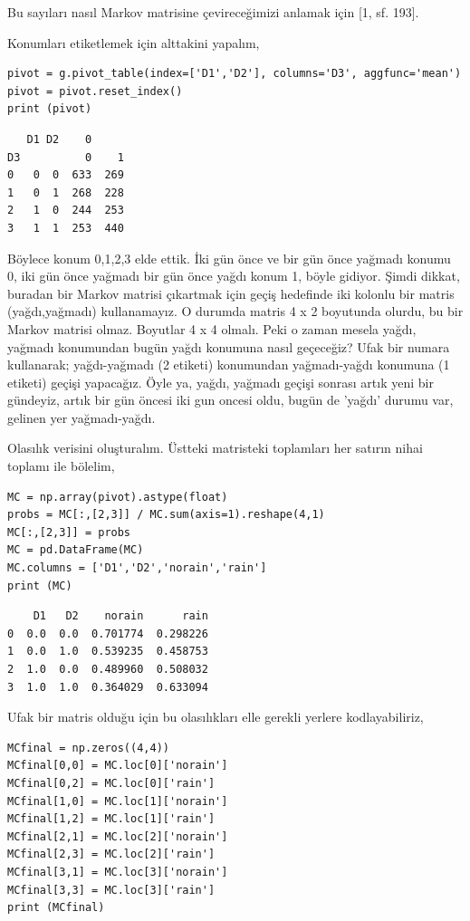 \documentclass[12pt,fleqn]{article}\usepackage{../../common}
\begin{document}
Bu sayıları nasıl Markov matrisine çevireceğimizi anlamak için [1, sf. 193].

Konumları etiketlemek için alttakini yapalım,

\begin{verbatim}
pivot = g.pivot_table(index=['D1','D2'], columns='D3', aggfunc='mean')
pivot = pivot.reset_index()
print (pivot)
\end{verbatim}

\begin{verbatim}
   D1 D2    0     
D3          0    1
0   0  0  633  269
1   0  1  268  228
2   1  0  244  253
3   1  1  253  440
\end{verbatim}

Böylece konum 0,1,2,3 elde ettik. İki gün önce ve bir gün önce yağmadı konumu 0,
iki gün önce yağmadı bir gün önce yağdı konum 1, böyle gidiyor. Şimdi dikkat,
buradan bir Markov matrisi çıkartmak için geçiş hedefinde iki kolonlu bir matris
(yağdı,yağmadı) kullanamayız. O durumda matris 4 x 2 boyutunda olurdu, bu bir
Markov matrisi olmaz. Boyutlar 4 x 4 olmalı. Peki o zaman mesela yağdı, yağmadı
konumundan bugün yağdı konumuna nasıl geçeceğiz? Ufak bir numara kullanarak;
yağdı-yağmadı (2 etiketi) konumundan yağmadı-yağdı konumuna (1 etiketi) geçişi
yapacağız. Öyle ya, yağdı, yağmadı geçişi sonrası artık yeni bir gündeyiz, artık
bir gün öncesi iki gun oncesi oldu, bugün de 'yağdı' durumu var, gelinen yer
yağmadı-yağdı.

Olasılık verisini oluşturalım. Üstteki matristeki toplamları her satırın nihai
toplamı ile bölelim,

\begin{verbatim}
MC = np.array(pivot).astype(float)
probs = MC[:,[2,3]] / MC.sum(axis=1).reshape(4,1)
MC[:,[2,3]] = probs
MC = pd.DataFrame(MC)
MC.columns = ['D1','D2','norain','rain']
print (MC)
\end{verbatim}

\begin{verbatim}
    D1   D2    norain      rain
0  0.0  0.0  0.701774  0.298226
1  0.0  1.0  0.539235  0.458753
2  1.0  0.0  0.489960  0.508032
3  1.0  1.0  0.364029  0.633094
\end{verbatim}

Ufak bir matris olduğu için bu olasılıkları elle gerekli yerlere kodlayabiliriz,

\begin{verbatim}
MCfinal = np.zeros((4,4))
MCfinal[0,0] = MC.loc[0]['norain']
MCfinal[0,2] = MC.loc[0]['rain']
MCfinal[1,0] = MC.loc[1]['norain']
MCfinal[1,2] = MC.loc[1]['rain']
MCfinal[2,1] = MC.loc[2]['norain']
MCfinal[2,3] = MC.loc[2]['rain']
MCfinal[3,1] = MC.loc[3]['norain']
MCfinal[3,3] = MC.loc[3]['rain']
print (MCfinal)
\end{verbatim}
\end{document}
